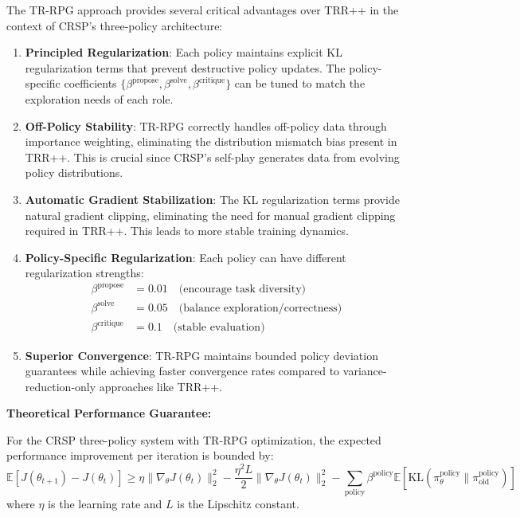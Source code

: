 \documentclass[10pt,a4paper]{article}
\begin{document}
The TR-RPG approach provides several critical advantages over TRR++ in the context of CRSP's three-policy architecture:

\begin{enumerate}
\item \textbf{Principled Regularization}: Each policy maintains explicit KL regularization terms that prevent destructive policy updates. The policy-specific coefficients $\{\beta^{\text{propose}}, \beta^{\text{solve}}, \beta^{\text{critique}}\}$ can be tuned to match the exploration needs of each role.

\item \textbf{Off-Policy Stability}: TR-RPG correctly handles off-policy data through importance weighting, eliminating the distribution mismatch bias present in TRR++. This is crucial since CRSP's self-play generates data from evolving policy distributions.

\item \textbf{Automatic Gradient Stabilization}: The KL regularization terms provide natural gradient clipping, eliminating the need for manual gradient clipping required in TRR++. This leads to more stable training dynamics.

\item \textbf{Policy-Specific Regularization}: Each policy can have different regularization strengths:
   \begin{align}
   \beta^{\text{propose}} &= 0.01 \quad \text{(encourage task diversity)} \\
   \beta^{\text{solve}} &= 0.05 \quad \text{(balance exploration/correctness)} \\
   \beta^{\text{critique}} &= 0.1 \quad \text{(stable evaluation)}
   \end{align}

\item \textbf{Superior Convergence}: TR-RPG maintains bounded policy deviation guarantees while achieving faster convergence rates compared to variance-reduction-only approaches like TRR++.
\end{enumerate}

\textbf{Theoretical Performance Guarantee:}

\begin{theorem}
For the CRSP three-policy system with TR-RPG optimization, the expected performance improvement per iteration is bounded by:
\begin{equation}
\mathbb{E}[J(\theta_{t+1}) - J(\theta_t)] \geq \eta \|\nabla_\theta J(\theta_t)\|_2^2 - \frac{\eta^2 L}{2} \|\nabla_\theta J(\theta_t)\|_2^2 - \sum_{\text{policy}} \beta^{\text{policy}} \mathbb{E}[\text{KL}(\pi_\theta^{\text{policy}} \| \pi_{\text{old}}^{\text{policy}})]
\end{equation}
where $\eta$ is the learning rate and $L$ is the Lipschitz constant.
\end{theorem}
\end{document}
